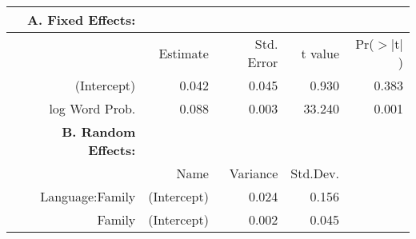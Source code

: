 \begin{tabular}{rrrrr}
 {\bf A. Fixed Effects:} \\
\hline
 & Estimate & Std. Error & t value & Pr($>$$|$t$|$) \\ 
  \hline
(Intercept) & 0.042 & 0.045 & 0.930 & 0.383 \\ 
  log Word Prob. & 0.088 & 0.003 & 33.240 & 0.001 \\ 

\hline \hline
{\bf B. Random Effects:} \\
\hline
& Name & Variance & Std.Dev. \\
\hline
Language:Family & (Intercept) & 0.024 & 0.156 \\
Family & (Intercept) & 0.002 & 0.045 \\
\end{tabular}
